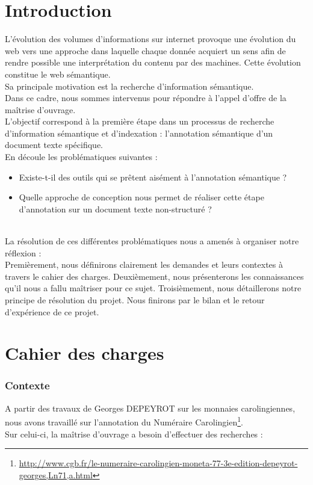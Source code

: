 \documentclass[a4paper, 11pt]{report}
\begin{document}
\part{Introduction}
L'évolution des volumes d'informations sur internet provoque une évolution du web vers une approche dans laquelle chaque donnée acquiert un sens afin de rendre possible une interprétation du contenu par des machines. Cette évolution constitue le web sémantique.\\
Sa principale motivation  est la recherche d’information sémantique.\\

Dans ce cadre, nous sommes intervenus pour répondre à l'appel d'offre de la maîtrise d'ouvrage. \\
L'objectif correspond à la première étape dans un processus de recherche d'information sémantique et d'indexation : l'annotation sémantique d'un document texte spécifique.\\

En découle les problématiques suivantes :
\begin{itemize}
\item Existe-t-il des outils qui se prêtent aisément à l'annotation sémantique ?
\item Quelle approche de conception nous permet de réaliser cette étape d'annotation sur un document texte non-structuré ?
\end{itemize}
	~\\
	
La résolution de ces différentes problématiques nous a amenés à organiser notre réflexion :\\
Premièrement, nous définirons clairement les demandes et leurs contextes à travers le cahier des charges. Deuxièmement, nous présenterons les connaissances qu'il nous a fallu maîtriser pour ce sujet. Troisièmement, nous détaillerons notre principe de résolution du projet. Nous finirons par le bilan et le retour d’expérience de ce projet.
\part{Cahier des charges}
	\section{Contexte}

A partir des travaux de Georges DEPEYROT sur les monnaies carolingiennes, nous avons travaillé sur l'annotation du Numéraire Carolingien\footnote{\url{http://www.cgb.fr/le-numeraire-carolingien-moneta-77-3e-edition-depeyrot-georges,Ln71,a.html}}.\\
Sur celui-ci, la maîtrise d'ouvrage a besoin d'effectuer des recherches :
\end{document}
